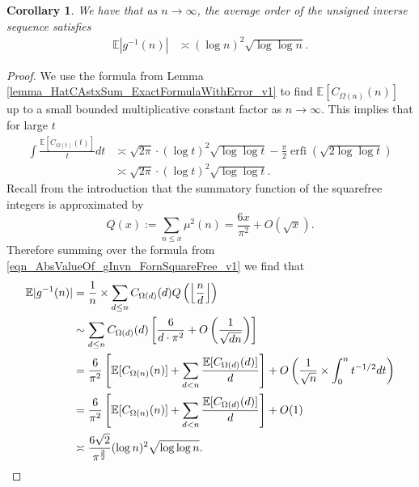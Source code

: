 \documentclass[11pt,reqno,a4letter]{article}
\numberwithin{figure}{section}
\numberwithin{table}{section}
\newcommand{\Floor}[2]{\ensuremath{\left\lfloor \frac{#1}{#2} \right\rfloor}}
\theoremstyle{plain}
\newtheorem{cor}[theorem]{Corollary}
\numberwithin{theorem}{section}
\theoremstyle{definition}
\begin{document}
\begin{cor}
\label{cor_ExpectationFormulaAbsgInvn_v2} 
We have that as $n \rightarrow \infty$, the average order of the 
unsigned inverse sequence satisfies 
\begin{align*} 
\mathbb{E}|g^{-1}(n)| & \asymp (\log n)^2 \sqrt{\log\log n}. 
\end{align*} 
\end{cor} 
\begin{proof} 
We use the formula from Lemma \ref{lemma_HatCAstxSum_ExactFormulaWithError_v1} 
to find $\mathbb{E}[C_{\Omega(n)}(n)]$ up to a small bounded multiplicative 
constant factor as $n \rightarrow \infty$.
This implies that for large $t$ 
\begin{align*} 
\int \frac{\mathbb{E}[C_{\Omega(t)}(t)]}{t} dt & \asymp 
     \sqrt{2\pi} \cdot (\log t)^2 \sqrt{\log\log t} - 
     \frac{\pi}{2} \operatorname{erfi}\left(\sqrt{2\log\log t}\right) \\ 
     & \asymp \sqrt{2\pi} \cdot (\log t)^2 \sqrt{\log\log t}. 
\end{align*} 
Recall from the introduction that the summatory function of the 
squarefree integers is approximated by 
\[
Q(x) := \sum_{n \leq x} \mu^2(n) = \frac{6x}{\pi^2} + O(\sqrt{x}). 
\]
Therefore summing over the formula from 
\eqref{eqn_AbsValueOf_gInvn_FornSquareFree_v1} we find that  
\begin{align} 
\notag 
\mathbb{E}|g^{-1}(n)| & = \frac{1}{n} \times \sum_{d \leq n} 
     C_{\Omega(d)}(d) Q\left(\Floor{n}{d}\right) \\ 
\notag 
     & \sim \sum_{d \leq n} C_{\Omega(d)}(d) \left[\frac{6}{d \cdot \pi^2} + O\left(\frac{1}{\sqrt{dn}}\right) 
     \right] \\ 
\notag 
     & = \frac{6}{\pi^2} \left[\mathbb{E}[C_{\Omega(n)}(n)] + \sum_{d<n} 
     \frac{\mathbb{E}[C_{\Omega(d)}(d)]}{d}\right] + 
     O\left(\frac{1}{\sqrt{n}} \times \int_0^{n} t^{-1/2} dt\right) \\ 
\label{eqn_proof_tag_ExpAbsgInvn_ExpandedByExpsOfCkn_v1} 
     & = \frac{6}{\pi^2}\left[\mathbb{E}[C_{\Omega(n)}(n)] + 
     \sum_{d<n} \frac{\mathbb{E}[C_{\Omega(d)}(d)]}{d}\right] + O(1) \\ 
\notag 
     & \asymp \frac{6 \sqrt{2}}{\pi^{\frac{3}{2}}} (\log n)^2 \sqrt{\log\log n}. 
     \qedhere 
\end{align} 
\end{proof} 
\end{document}
